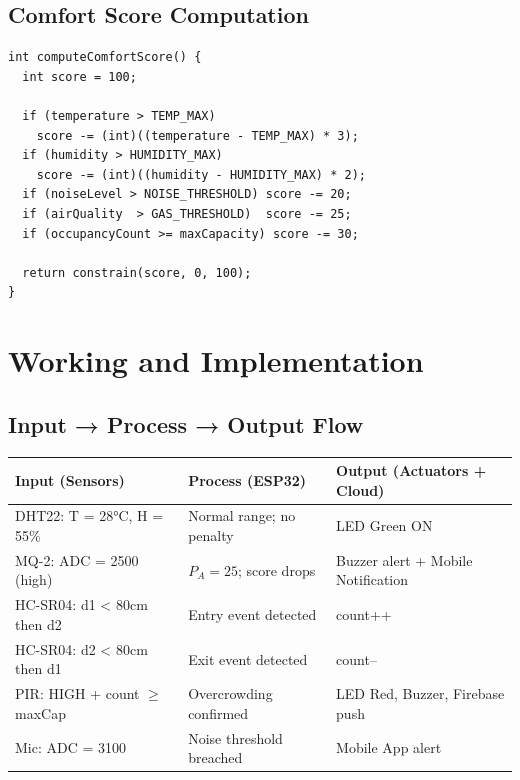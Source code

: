 \documentclass[12pt,a4paper]{article}
\begin{document}
\subsection{Comfort Score Computation}

\begin{lstlisting}[caption={Composite Comfort Score (0--100)}]
int computeComfortScore() {
  int score = 100;

  if (temperature > TEMP_MAX)
    score -= (int)((temperature - TEMP_MAX) * 3);
  if (humidity > HUMIDITY_MAX)
    score -= (int)((humidity - HUMIDITY_MAX) * 2);
  if (noiseLevel > NOISE_THRESHOLD) score -= 20;
  if (airQuality  > GAS_THRESHOLD)  score -= 25;
  if (occupancyCount >= maxCapacity) score -= 30;

  return constrain(score, 0, 100);
}
\end{lstlisting}

\newpage

\section{Working and Implementation}

\subsection{Input → Process → Output Flow}

\begin{center}
\begin{tabular}{p{4cm} p{5.5cm} p{4.5cm}}
\toprule
\textbf{Input (Sensors)} & \textbf{Process (ESP32)} & \textbf{Output (Actuators + Cloud)} \\
\midrule
DHT22: T = 28°C, H = 55\% & Normal range; no penalty & LED Green ON \\
MQ-2: ADC = 2500 (high) & $P_A = 25$; score drops & Buzzer alert + Mobile Notification \\
HC-SR04: d1 < 80cm then d2 & Entry event detected & count++ \\
HC-SR04: d2 < 80cm then d1 & Exit event detected & count-- \\
PIR: HIGH + count $\geq$ maxCap & Overcrowding confirmed & LED Red, Buzzer, Firebase push \\
Mic: ADC = 3100 & Noise threshold breached & Mobile App alert \\
\bottomrule
\end{tabular}
\end{center}
\end{document}
